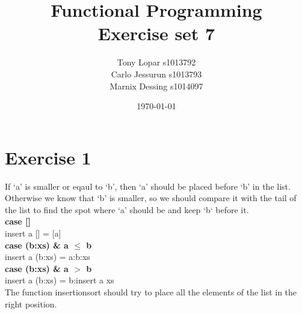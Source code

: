 \documentclass{article}
\begin{document}
\title{Functional Programming \\ Exercise set 7}
\date{\today}
\author{Tony Lopar s1013792 \\ Carlo Jessurun s1013793 \\ Marnix Dessing s1014097}
\maketitle

\section*{Exercise 1}
If `a' is smaller or eqaul to `b', then `a' should be placed before `b' in the list. Otherwise we know that `b' is smaller, so we should compare it with the tail of the list to find the spot where `a' should be and keep `b` before it. \\
\textbf{case []} \\
  insert \enspace a [] = [a] \\
\textbf{case (b:xs) \& a $\leq$ b} \\
  insert \enspace a (b:xs) = a:b:xs \\
\textbf{case (b:xs) \& a $>$ b} \\
  insert \enspace a (b:xs) = b:insert \enspace a \enspace xs \\

The function insertionsort should try to place all the elements of the list in the right position.
\end{document}
